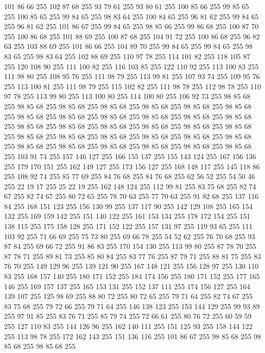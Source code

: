 101 86 66 255 102 87 68 255 93 79 61 255 93 80 61 255 100 85 66 255 99 85 65 255 100 85 65 255 99 84 65 255 98 83 64 255 100 84 65 255 96 81 62 255 99 84 65 255 96 81 62 255 101 86 67 255 99 84 65 255 98 85 66 255 99 86 68 255 100 87 70 255 100 86 68 255 101 88 69 255 100 87 68 255 104 91 72 255 100 86 68 255 96 82 63 255 103 88 69 255 101 86 66 255 104 89 70 255 99 84 65 255 99 84 65 255 98 83 65 255 98 83 64 255 102 88 69 255 110 97 78 255 114 101 82 255 118 105 87 255 120 108 90 255 111 100 82 255 116 103 85 255 122 110 92 255 113 100 83 255 111 98 80 255 108 95 76 255 111 98 79 255 113 99 81 255 107 93 74 255 109 95 76 255 113 100 81 255 111 98 79 255 115 102 82 255 111 98 78 255 112 98 78 255 110 97 78 255 113 99 80 255 113 100 80 255 114 100 80 255 106 92 73 255 98 85 68 255 98 85 68 255 98 85 68 255 98 85 68 255 98 85 68 255 98 85 68 255 98 85 68 255 98 85 68 255
98 85 68 255 98 85 68 255 98 85 68 255 98 85 68 255 98 85 68 255 98 85 68 255 98 85 68 255 98 85 68 255 98 85 68 255 98 85 68 255 98 85 68 255 98 85 68 255 98 85 68 255 98 85 68 255 98 85 68 255 98 85 68 255 98 85 68 255 98 85 68 255 98 85 68 255 98 85 68 255 98 85 68 255 98 85 68 255 98 85 68 255 103 91 74 255 157 146 127 255 166 155 137 255 155 143 124 255 167 156 136 255 179 170 151 255 162 149 127 255 173 156 127 255 168 148 117 255 145 118 86 255 108 92 74 255 85 77 69 255 84 76 68 255 84 76 68 255 62 56 52 255 54 50 46 255 22 19 17 255 25 22 19 255 162 148 124 255 112 99 81 255 83 75 68 255 82 74 67 255 82 74 67 255 80 72 65 255 78 70 63 255 77 70 63 255 91 82 68 255 137 116 84 255 168 151 123 255 156 130 99 255 137 117 90 255 142 129 108 255 165 154 132 255 169 159 142 255 151 140 122 255 161 153 134 255 178 172 154 255 151 138 115 255 175 158 128 255 171 152 122 255 157 131 97 255
119 93 65 255 111 103 92 255 71 66 69 255 75 73 80 255 69 66 78 255 54 52 62 255 76 70 68 255 93 87 84 255 69 66 72 255 91 86 83 255 170 154 130 255 113 99 80 255 87 78 70 255 87 78 71 255 89 81 73 255 85 80 84 255 83 77 76 255 87 79 71 255 88 81 75 255 83 76 70 255 149 129 96 255 139 121 90 255 167 148 121 255 156 128 97 255 130 110 83 255 168 157 140 255 180 171 152 255 184 174 156 255 180 171 152 255 177 165 146 255 169 157 137 255 165 153 131 255 152 137 111 255 174 156 127 255 164 139 107 255 125 98 69 255 88 80 72 255 80 72 65 255 79 71 64 255 82 74 67 255 83 75 68 255 79 72 66 255 79 71 64 255 146 138 123 255 153 144 129 255 99 93 89 255 97 91 85 255 83 76 71 255 85 79 74 255 72 66 61 255 80 76 72 255 60 59 59 255 127 110 83 255 144 126 96 255 162 140 111 255 151 125 93 255 158 144 122 255 113 98 78 255 172 162 143 255 151 136 116 255 101 86 67 255 98 85 68 255 98 85 68 255 98 85 68 255
